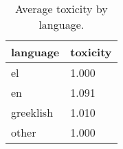 \begin{table}
\caption{Average toxicity by language.}
\label{tab::toxic_lang}
\begin{tabular}{|p{3.5cm}|p{1cm}|}
\toprule
language & toxicity \\
\midrule
el & 1.000 \\
en & 1.091 \\
greeklish & 1.010 \\
other & 1.000 \\
\bottomrule
\end{tabular}
\end{table}
